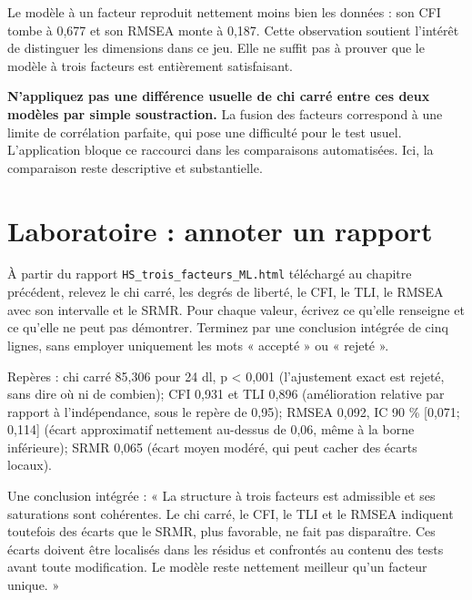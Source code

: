 \documentclass[
  french,
  11pt,
  a4paper,
  DIV=11,
  numbers=noendperiod]{scrreprt}
\begin{document}
Le modèle à un facteur reproduit nettement moins bien les données : son
CFI tombe à 0,677 et son RMSEA monte à 0,187. Cette observation soutient
l'intérêt de distinguer les dimensions dans ce jeu. Elle ne suffit pas à
prouver que le modèle à trois facteurs est entièrement satisfaisant.

\textbf{N'appliquez pas une différence usuelle de chi carré entre ces
deux modèles par simple soustraction.} La fusion des facteurs correspond
à une limite de corrélation parfaite, qui pose une difficulté pour le
test usuel. L'application bloque ce raccourci dans les comparaisons
automatisées. Ici, la comparaison reste descriptive et substantielle.

\section{Laboratoire : annoter un
rapport}\label{laboratoire-annoter-un-rapport}

À partir du rapport \texttt{HS\_trois\_facteurs\_ML.html} téléchargé au
chapitre précédent, relevez le chi carré, les degrés de liberté, le CFI,
le TLI, le RMSEA avec son intervalle et le SRMR. Pour chaque valeur,
écrivez ce qu'elle renseigne et ce qu'elle ne peut pas démontrer.
Terminez par une conclusion intégrée de cinq lignes, sans employer
uniquement les mots « accepté » ou « rejeté ».

\begin{tcolorbox}[enhanced jigsaw, arc=.35mm, bottomrule=.15mm, bottomtitle=1mm, breakable, colback=white, colbacktitle=quarto-callout-tip-color!10!white, colframe=quarto-callout-tip-color-frame, coltitle=black, left=2mm, leftrule=.75mm, opacityback=0, opacitybacktitle=0.6, rightrule=.15mm, title={Réponse}, titlerule=0mm, toprule=.15mm, toptitle=1mm]

Repères : chi carré 85,306 pour 24 dl, p \textless{} 0,001 (l'ajustement
exact est rejeté, sans dire où ni de combien); CFI 0,931 et TLI 0,896
(amélioration relative par rapport à l'indépendance, sous le repère de
0,95); RMSEA 0,092, IC 90 \% {[}0,071; 0,114{]} (écart approximatif
nettement au-dessus de 0,06, même à la borne inférieure); SRMR 0,065
(écart moyen modéré, qui peut cacher des écarts locaux).

Une conclusion intégrée : « La structure à trois facteurs est admissible
et ses saturations sont cohérentes. Le chi carré, le CFI, le TLI et le
RMSEA indiquent toutefois des écarts que le SRMR, plus favorable, ne
fait pas disparaître. Ces écarts doivent être localisés dans les résidus
et confrontés au contenu des tests avant toute modification. Le modèle
reste nettement meilleur qu'un facteur unique. »

\end{tcolorbox}
\end{document}
